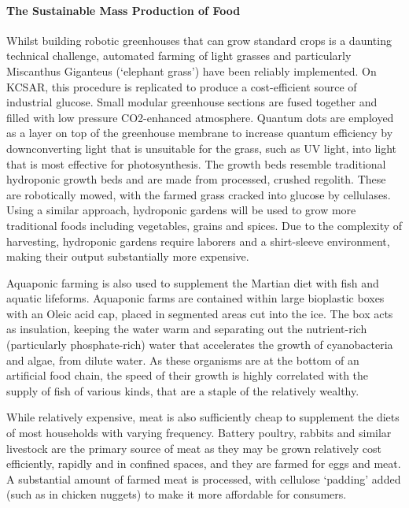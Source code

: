 \documentclass[fleqn,10pt]{Stylesheet} %
\begin{document}
\paragraph{The Sustainable Mass Production of Food}

Whilst building robotic greenhouses that can grow standard crops is a daunting technical challenge, automated farming of light grasses and particularly Miscanthus Giganteus (‘elephant grass’) have been reliably implemented. On KCSAR, this procedure is replicated to produce a cost-efficient source of industrial glucose. Small modular greenhouse sections are fused together and filled with low pressure CO2-enhanced atmosphere. Quantum dots are employed as a layer on top of the greenhouse membrane to increase quantum efficiency by downconverting light that is unsuitable for the grass, such as UV light, into light that is most effective for photosynthesis. The growth beds resemble traditional hydroponic growth beds and are made from processed, crushed regolith. These are robotically mowed, with the farmed grass cracked into glucose by cellulases. Using a similar approach, hydroponic gardens will be used to grow more traditional foods including vegetables, grains and spices. Due to the complexity of harvesting, hydroponic gardens require laborers and a shirt-sleeve environment, making their output substantially more expensive.

Aquaponic farming is also used to supplement the Martian diet with fish and aquatic lifeforms. Aquaponic farms are contained within large bioplastic boxes with an Oleic acid cap, placed in segmented areas cut into the ice. The box acts as insulation, keeping the water warm and separating out the nutrient-rich (particularly phosphate-rich) water that accelerates the growth of cyanobacteria and algae, from dilute water. As these organisms are at the bottom of an artificial food chain, the speed of their growth is highly correlated with the supply of fish of various kinds, that are a staple of the relatively wealthy. 

While relatively expensive, meat is also sufficiently cheap to supplement the diets of most households with varying frequency. Battery poultry, rabbits and similar livestock are the primary source of meat as they may be grown relatively cost efficiently, rapidly and in confined spaces, and they are farmed for eggs and meat. A substantial amount of farmed meat is processed, with cellulose ‘padding’ added (such as in chicken nuggets) to make it more affordable for consumers. 
\end{document}
